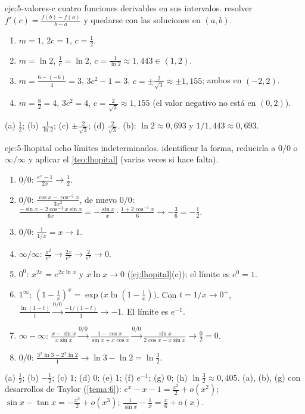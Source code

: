 \begin{solucion}{eje:5-valores-c}
\datos cuatro funciones derivables en sus intervalos.
\planteamiento resolver $f'(c)=\frac{f(b)-f(a)}{b-a}$ y quedarse con las soluciones en $(a,b)$.
\pasos
\begin{enumerate}[label=(\alph*)]
  \item $m=1$, $2c=1$, $c=\frac12$.
  \item $m=\ln2$, $\frac1c=\ln2$, $c=\frac{1}{\ln2}\approx1{,}443\in(1,2)$.
  \item $m=\frac{6-(-6)}{4}=3$, $3c^{2}-1=3$, $c=\pm\frac{2}{\sqrt3}\approx\pm1{,}155$; ambos en $(-2,2)$.
  \item $m=\frac82=4$, $3c^{2}=4$, $c=\frac{2}{\sqrt3}\approx1{,}155$ (el valor negativo no está en $(0,2)$).
\end{enumerate}
\resultado (a) $\frac12$; (b) $\frac{1}{\ln2}$; (c) $\pm\frac{2}{\sqrt3}$; (d) $\frac{2}{\sqrt3}$.
\comprobacion (b): $\ln2\approx0{,}693$ y $1/1{,}443\approx0{,}693$.
\end{solucion}

\begin{solucion}{eje:5-lhopital}
\datos ocho límites indeterminados.
\planteamiento identificar la forma, reducirla a $0/0$ o $\infty/\infty$ y aplicar el \cref{teo:lhopital} (varias veces si hace falta).
\pasos
\begin{enumerate}[label=(\alph*)]
  \item $0/0$: $\frac{e^{x}-1}{2x}\to\frac12$.
  \item $0/0$: $\frac{\cos x-\cos^{-2}x}{3x^{2}}$, de nuevo $0/0$: $\frac{-\sin x-2\cos^{-3}x\sin x}{6x}=-\frac{\sin x}{x}\cdot\frac{1+2\cos^{-3}x}{6}\to-\frac{3}{6}=-\frac12$.
  \item $0/0$: $\frac{1}{1/x}=x\to1$.
  \item $\infty/\infty$: $\frac{x^{2}}{e^{x}}\to\frac{2x}{e^{x}}\to\frac{2}{e^{x}}\to0$.
  \item $0^{0}$: $x^{2x}=e^{2x\ln x}$ y $x\ln x\to0$ (\cref{ej:lhopital}(c)); el límite es $e^{0}=1$.
  \item $1^{\infty}$: $(1-\frac1x)^{x}=\exp\bigl(x\ln(1-\frac1x)\bigr)$. Con $t=1/x\to0^{+}$, $\frac{\ln(1-t)}{t}\overset{0/0}{\to}\frac{-1/(1-t)}{1}\to-1$. El límite es $e^{-1}$.
  \item $\infty-\infty$: $\frac{x-\sin x}{x\sin x}\overset{0/0}{\to}\frac{1-\cos x}{\sin x+x\cos x}\overset{0/0}{\to}\frac{\sin x}{2\cos x-x\sin x}\to\frac02=0$.
  \item $0/0$: $\frac{3^{x}\ln3-2^{x}\ln2}{1}\to\ln3-\ln2=\ln\frac32$.
\end{enumerate}
\resultado (a) $\frac12$; (b) $-\frac12$; (c) $1$; (d) $0$; (e) $1$; (f) $e^{-1}$; (g) $0$; (h) $\ln\frac32\approx0{,}405$.
\comprobacion (a), (b), (g) con desarrollos de Taylor (\cref{tema:6}): $e^{x}-x-1=\frac{x^{2}}{2}+o(x^{2})$; $\sin x-\tan x=-\frac{x^{3}}{2}+o(x^{3})$; $\frac1{\sin x}-\frac1x=\frac x6+o(x)$.
\end{solucion}

